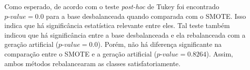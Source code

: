 
Como esperado, de acordo com o teste \textit{post-hoc} de Tukey foi encontrado $\textit{p-value} = 0.0$ para a base desbalanceada quando comparada com o SMOTE. Isso indica que há significância estatística relevante entre eles. Tal teste também indicou que há significância entre a base desbalanceada e ela rebalanceada com a geração artificial ($\textit{p-value} = 0.0$). Porém, não há diferença significante na comparação entre o SMOTE e a geração artificial ($\textit{p-value} = 0.8264$). Assim, ambos métodos rebalancearam as classes satisfatoriamente.

%




